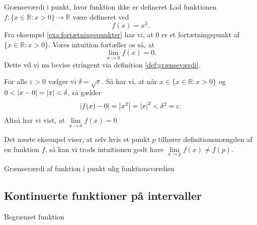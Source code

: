 \begin{example}[label=exa:grænseværdi]{Grænseværdi i punkt, hvor funktion ikke er defineret}{}
 Lad funktionen $f:\{ x \in \mathbb{R}:x>0 \} \to \mathbb{R}$ være defineret ved
  \[
  f(x)= x^2.
  \] 
  Fra eksempel \ref{exa:fortætningspunkter} har vi, at $0$ er et fortætningspunkt af $\{ x \in \mathbb{R}:x>0 \} $. 
  Vores intuition fortæller os så, at
  \[
  \lim_{x \to 0} f(x)= 0.
  \] 
  Dette vil vi nu bevise stringent via definition \ref{def:grænseværdi}.

  For alle $\varepsilon >0$ vælger vi $\delta =\sqrt{\varepsilon } $. 
  Så har vi, at når $x \in \{ x \in \mathbb{R}:x>0 \} $ og $0<\abs{x-0} =\abs{x} <\delta $, så gælder
  \[
    \abs{f(x)-0} =\abs{x^2}=\abs{x}^2<\delta ^2=\varepsilon.
  \] 
  Altså har vi vist, at $\lim\limits_{x \to 0}f(x)=0$.
\end{example}

Det næste eksempel viser, at selv hvis et punkt $p$ tilhører definitionsmængden af en funktion $f$, så kan vi trods intuitionen godt have $\lim\limits_{x \to p} f(x) \neq f(p)$.

\begin{example}[label=exa:grænseværdi2]{Grænseværdi af funktion i punkt ulig funktionsværdien}{}
  
\end{example}

\subsection{Kontinuerte funktioner på intervaller}%
\label{sub:Kontinuert}


\begin{definition}{Begrænset funktion}{}
  
\end{definition}

